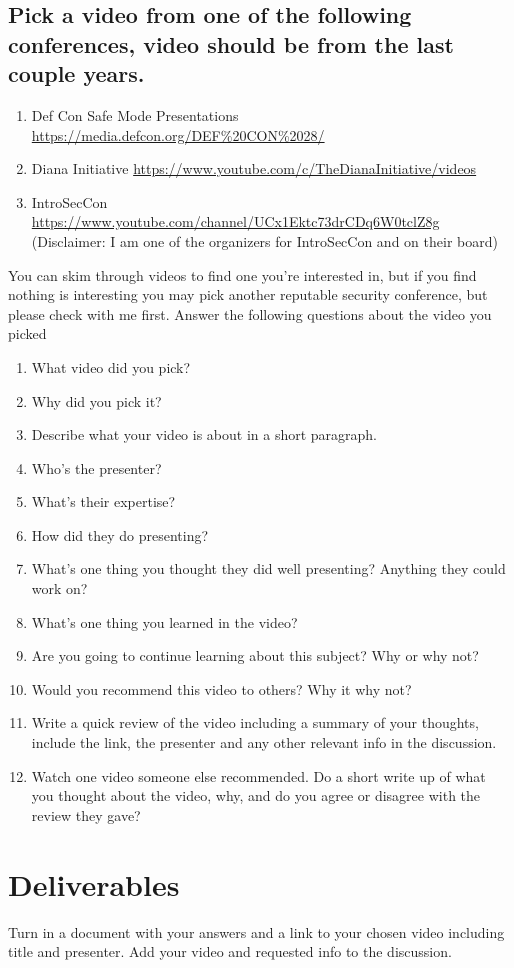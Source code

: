 \documentclass[12pt]{article}
\begin{document}
\subsection*{Pick a video from one of the following conferences, video should be from the last couple years.}
\begin{enumerate}
    \item Def Con Safe Mode Presentations \url{https://media.defcon.org/DEF%20CON%2028/}
    \item Diana Initiative \url{https://www.youtube.com/c/TheDianaInitiative/videos}
    \item IntroSecCon \url{https://www.youtube.com/channel/UCx1Ektc73drCDq6W0tclZ8g} (Disclaimer:  I am one of the organizers for IntroSecCon and on their board)
\end{enumerate}
You can skim through videos to find one you're interested in, but if you find nothing is interesting you may pick another reputable security conference, but please check with me first. Answer the following questions about the video you picked
    \begin{enumerate}
        \item What video did you pick?
        \item Why did you pick it?
        \item Describe what your video is about in a short paragraph.
        \item Who's the presenter?
        \item What's their expertise?
        \item How did they do presenting?
        \item What's one thing you thought they did well presenting? Anything they could work on?
        \item What's one thing you learned in the video?
        \item Are you going to continue learning about this subject? Why or why not? 
        \item Would you recommend this video to others? Why it why not?
        \item Write a quick review of the video including a summary of your thoughts, include the link, the presenter and any other relevant info in the discussion.
        \item Watch one video someone else recommended. Do a short write up of what you thought about the video, why, and do you agree or disagree with the review they gave?
    \end{enumerate}



\section*{Deliverables}
Turn in a document with your answers and a link to your chosen video including title and presenter.  Add your video and requested info to the discussion.
\end{document}
